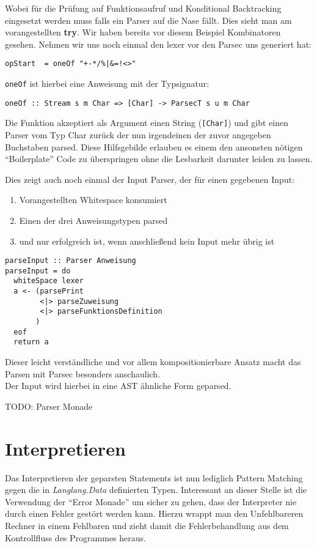 \documentclass[12pt,german]{article}
\begin{document}
\noindent Wobei für die Prüfung auf Funktionsaufruf und Konditional Backtracking
eingesetzt werden muss falls ein Parser auf die Nase fällt. Dies sieht
man am vorangestellten \textbf{try}. Wir haben bereits vor diesem
Beispiel Kombinatoren gesehen. Nehmen wir uns noch einmal den lexer
vor den Parsec uns generiert hat:
\begin{lstlisting}
opStart  = oneOf "+-*/%|&=!<>"
\end{lstlisting}
\texttt{oneOf} ist hierbei eine Anweisung mit der Typsignatur:
\begin{lstlisting}
oneOf :: Stream s m Char => [Char] -> ParsecT s u m Char
\end{lstlisting}
Die Funktion akzeptiert als Argument einen String (\texttt{[Char]}) und
gibt einen Parser vom Typ Char zurück der nun irgendeinen der zuvor
angegeben Buchstaben parsed. Diese Hilfsgebilde erlauben es einem den
ansonsten nötigen ``Boilerplate'' Code zu überspringen ohne die
Lesbarkeit darunter leiden zu lassen.\cite{ParsecChar14}

Dies zeigt auch noch einmal der Input Parser, der für einen gegebenen Input:
\begin{enumerate}
\item Vorangestellten Whitespace konsumiert
\item Einen der drei Anweisungstypen parsed
\item und nur erfolgreich ist, wenn anschließend kein Input mehr übrig ist
\end{enumerate}

\begin{lstlisting}[caption=Inputparser]
parseInput :: Parser Anweisung
parseInput = do
  whiteSpace lexer
  a <- (parsePrint
        <|> parseZuweisung
        <|> parseFunktionsDefinition
       )
  eof
  return a
\end{lstlisting}

\noindent Dieser leicht verständliche und vor allem kompositionierbare Ansatz
macht das Parsen mit Parsec besonders anschaulich.\\
Der Input wird hierbei in eine AST ähnliche Form geparsed.

TODO: Parser Monade \cite{GHEM}

\section{Interpretieren}

Das Interpretieren der geparsten Statements ist nun lediglich Pattern
Matching gegen die in \textit{Langlang.Data} definierten Typen.
Interessant an dieser Stelle ist die Verwendung der ``Error Monade''
um sicher zu gehen, dass der Interpreter nie durch einen Fehler gestört
werden kann. Hierzu wrappt man den Unfehlbareren
Rechner in einem Fehlbaren und zieht damit die Fehlerbehandlung aus
dem Kontrollfluss des Programmes heraus.
\end{document}

